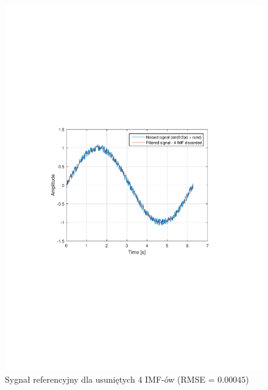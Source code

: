 \begin{figure}[!htb]
    \begin{center}
        \includegraphics[width=13cm,trim=4cm 9.5cm 4cm 10cm,clip]
        {../img/sin_rmse4.pdf}
    \end{center}
    \caption{Sygnał referencyjny dla usuniętych 4 IMF-ów (RMSE = $0.00045$)}
    \label{rys:sin_rmse4}
\end{figure}

